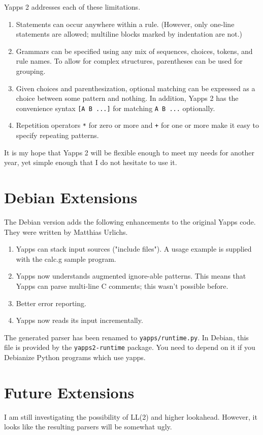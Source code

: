 \documentclass[10pt]{article}
\newcommand{\mysection}[1]{\section{#1}}
\begin{document}
Yapps 2 addresses each of these limitations.

\begin{enumerate}
 \item Statements can occur anywhere within a rule.  (However, only
   one-line statements are allowed; multiline blocks marked by
   indentation are not.)
 \item Grammars can be specified using any mix of sequences, choices,
   tokens, and rule names.  To allow for complex structures,
   parentheses can be used for grouping.
 \item Given choices and parenthesization, optional matching can be
   expressed as a choice between some pattern and nothing.  In
   addition, Yapps 2 has the convenience syntax \verb|[A B ...]| for
   matching \verb|A B ...| optionally.
 \item Repetition operators \verb|*| for zero or more and \verb|+| for 
   one or more make it easy to specify repeating patterns.
\end{enumerate}

It is my hope that Yapps 2 will be flexible enough to meet my needs
for another year, yet simple enough that I do not hesitate to use it.

\mysection{Debian Extensions}
\label{sec:debian}

The Debian version adds the following enhancements to the original
Yapps code. They were written by Matthias Urlichs.

\begin{enumerate}
 \item Yapps can stack input sources ("include files"). A usage example
 is supplied with the calc.g sample program.
 \item Yapps now understands augmented ignore-able patterns.
  This means that Yapps can parse multi-line C comments; this wasn't
  possible before.
 \item Better error reporting.
 \item Yapps now reads its input incrementally.
\end{enumerate}

The generated parser has been renamed to \texttt{yapps/runtime.py}.
In Debian, this file is provided by the \texttt{yapps2-runtime} package.
You need to depend on it if you Debianize Python programs which use
yapps.

\mysection{Future Extensions}
\label{sec:future}

I am still investigating the possibility of LL(2) and higher
lookahead.  However, it looks like the resulting parsers will be
somewhat ugly.  
\end{document}
